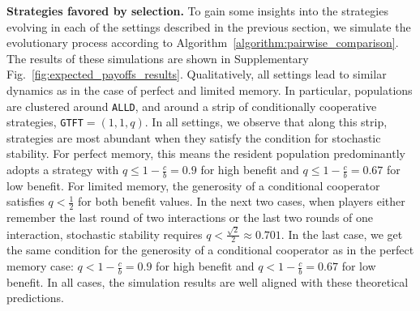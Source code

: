 \documentclass[11pt]{article}
\def\alld{\texttt{ALLD}}
\def\gtft{\texttt{GTFT}}
\theoremstyle{plainCl1}
\theoremstyle{plainCl2}
\begin{document}
{\bf Strategies favored by selection.} 
To gain some insights into the strategies evolving in each of the settings described in the previous section, we simulate the evolutionary process according to Algorithm~\ref{algorithm:pairwise_comparison}. 
The results of these simulations are shown in Supplementary Fig.~\ref{fig:expected_payoffs_results}. 
Qualitatively, all settings lead to similar dynamics as in the case of perfect and limited memory. 
In particular, populations are clustered around \alld, and around a strip of conditionally cooperative strategies, \gtft$=\!(1,1,q)$. 
In all settings, we observe that along this strip, strategies are most abundant when they satisfy the condition for stochastic stability. 
For perfect memory, this means the resident population predominantly adopts a
strategy with \(q \leq 1 - \frac{c}{b} = 0.9\) for high benefit and \(q \leq 1 -
\frac{c}{b} = 0.67\) for low benefit.
For limited memory, the generosity of a conditional cooperator satisfies \(q <
\frac{1}{2}\) for both benefit values.
In the next two cases, when players either remember the last round of two
interactions or the last two rounds of one interaction, stochastic stability
requires \(q < \frac{\sqrt{2}}{2} \approx 0.701\).
In the last case, we get the same condition for the generosity of a conditional cooperator as in the perfect memory case:
\(q < 1 - \frac{c}{b} = 0.9\) for high benefit and \(q < 1 - \frac{c}{b} =
0.67\) for low benefit.
In all cases, the simulation results are well aligned with these theoretical predictions.\\


\end{document}
